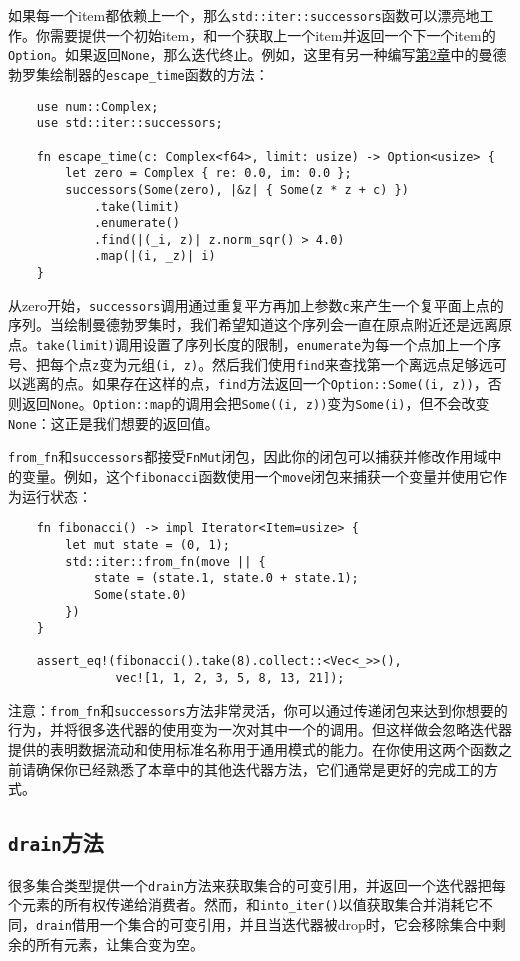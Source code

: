 如果每一个item都依赖上一个，那么\texttt{std::iter::successors}函数可以漂亮地工作。你需要提供一个初始item，和一个获取上一个item并返回一个下一个item的\texttt{Option}。如果返回\texttt{None}，那么迭代终止。例如，这里有另一种编写\hyperref[ch02]{第2章}中的曼德勃罗集绘制器的\texttt{escape\_time}函数的方法：
\begin{verbatim}
    use num::Complex;
    use std::iter::successors;

    fn escape_time(c: Complex<f64>, limit: usize) -> Option<usize> {
        let zero = Complex { re: 0.0, im: 0.0 };
        successors(Some(zero), |&z| { Some(z * z + c) })
            .take(limit)
            .enumerate()
            .find(|(_i, z)| z.norm_sqr() > 4.0)
            .map(|(i, _z)| i)
    }
\end{verbatim}

从zero开始，\texttt{successors}调用通过重复平方再加上参数\texttt{c}来产生一个复平面上点的序列。当绘制曼德勃罗集时，我们希望知道这个序列会一直在原点附近还是远离原点。\texttt{take(limit)}调用设置了序列长度的限制，\texttt{enumerate}为每一个点加上一个序号、把每个点\texttt{z}变为元组\texttt{(i, z)}。然后我们使用\texttt{find}来查找第一个离远点足够远可以逃离的点。如果存在这样的点，\texttt{find}方法返回一个\texttt{Option::Some((i, z))}，否则返回\texttt{None}。\texttt{Option::map}的调用会把\texttt{Some((i, z))}变为\texttt{Some(i)}，但不会改变\texttt{None}：这正是我们想要的返回值。

\texttt{from\_fn}和\texttt{successors}都接受\texttt{FnMut}闭包，因此你的闭包可以捕获并修改作用域中的变量。例如，这个\texttt{fibonacci}函数使用一个\texttt{move}闭包来捕获一个变量并使用它作为运行状态：
\begin{verbatim}
    fn fibonacci() -> impl Iterator<Item=usize> {
        let mut state = (0, 1);
        std::iter::from_fn(move || {
            state = (state.1, state.0 + state.1);
            Some(state.0)
        })
    }

    assert_eq!(fibonacci().take(8).collect::<Vec<_>>(),
               vec![1, 1, 2, 3, 5, 8, 13, 21]);
\end{verbatim}

注意：\texttt{from\_fn}和\texttt{successors}方法非常灵活，你可以通过传递闭包来达到你想要的行为，并将很多迭代器的使用变为一次对其中一个的调用。但这样做会忽略迭代器提供的表明数据流动和使用标准名称用于通用模式的能力。在你使用这两个函数之前请确保你已经熟悉了本章中的其他迭代器方法，它们通常是更好的完成工的方式。

\subsection{\texttt{drain}方法}
很多集合类型提供一个\texttt{drain}方法来获取集合的可变引用，并返回一个迭代器把每个元素的所有权传递给消费者。然而，和\texttt{into\_iter()}以值获取集合并消耗它不同，\texttt{drain}借用一个集合的可变引用，并且当迭代器被drop时，它会移除集合中剩余的所有元素，让集合变为空。

